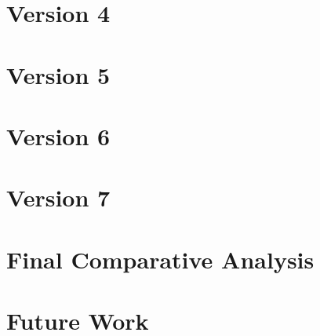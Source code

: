 \documentclass[12pt,a4paper]{report}
\begin{document}
\chapter{Version 4}
%

\chapter{Version 5}
%

\chapter{Version 6}
%

\chapter{Version 7}
%

\chapter{Final Comparative Analysis}

\chapter{Future Work}
\end{document}
